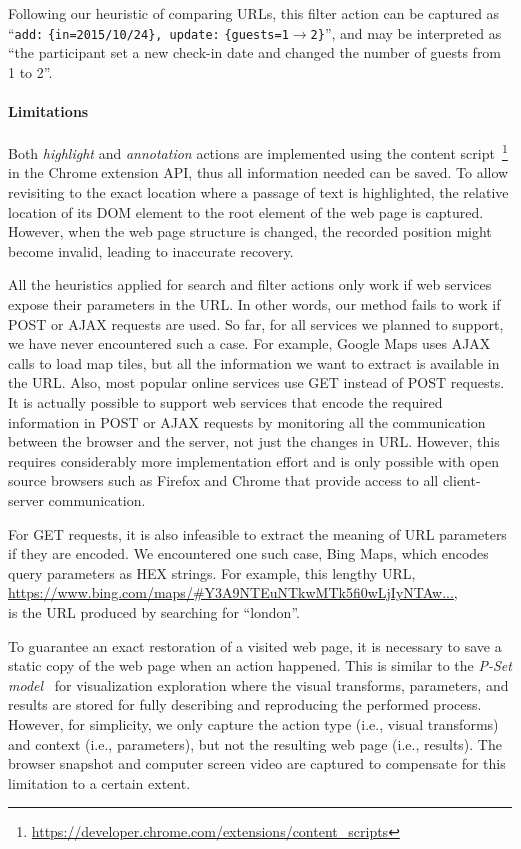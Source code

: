 Following our heuristic of comparing URLs, this filter action can be captured as ``\texttt{add:} \texttt{\{in=2015/10/24\}, update:} \texttt{\{guests=1$\rightarrow$2\}}'', and may be interpreted as ``the participant set a new check-in date and changed the number of guests from 1 to 2''.

\paragraph{Limitations} Both \emph{highlight} and \emph{annotation} actions are implemented using the content script~\footnote{\url{https://developer.chrome.com/extensions/content_scripts}} in the Chrome extension API, thus all information needed can be saved. To allow revisiting to the exact location where a passage of text is highlighted, the relative location of its DOM element to the root element of the web page is captured. However, when the web page structure is changed, the recorded position might become invalid, leading to inaccurate recovery.

All the heuristics applied for search and filter actions only work if web services expose their parameters in the URL. In other words, our method fails to work if POST or AJAX requests are used. So far, for all services we planned to support, we have never encountered such a case. For example, Google Maps uses AJAX calls to load map tiles, but all the information we want to extract is available in the URL. Also, most popular online services use GET instead of POST requests. It is actually possible to support web services that encode the required information in POST or AJAX requests by monitoring all the communication between the browser and the server, not just the changes in URL. However, this requires considerably more implementation effort and is only possible with open source browsers such as Firefox and Chrome that provide access to all client-server communication.

For GET requests, it is also infeasible to extract the meaning of URL parameters if they are encoded. We encountered one such case, Bing Maps, which encodes query parameters as HEX strings. For example, this lengthy URL, \url{https://www.bing.com/maps/#Y3A9NTEuNTkwMTk5fi0wLjIyNTAw...}, \\is the URL produced by searching for ``london''.

To guarantee an exact restoration of a visited web page, it is necessary to save a static copy of the web page when an action happened. This is similar to the \emph{P-Set model}~\cite{Jankun-Kelly2007} for visualization exploration where the visual transforms, parameters, and results are stored for fully describing and reproducing the performed process. However, for simplicity, we only capture the action type (i.e., visual transforms) and context (i.e., parameters), but not the resulting web page (i.e., results). The browser snapshot and computer screen video are captured to compensate for this limitation to a certain extent.

